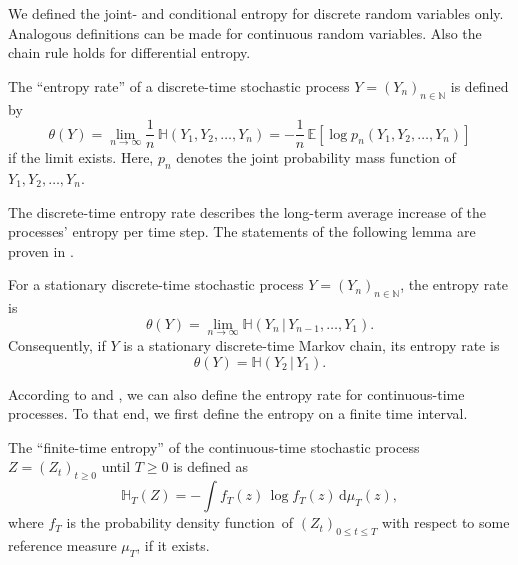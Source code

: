 \documentclass[smallextended]{svjour3}
\newcommand{\N}{\mathbb{N}}
\newcommand{\E}{\mathbb{E}}
\renewcommand{\H}{\mathbb{H}}
\newcommand{\liml}{\lim\limits}
\newcommand{\dd}[1]{\,\mathrm{d}#1}
\newcommand{\pdf}{probability density function}
\renewcommand{\emph}[1]{``#1''}
\begin{document}
\begin{myremark}
	We defined the joint- and conditional entropy for discrete random variables only.
	Analogous definitions can be made for continuous random variables.
	Also the chain rule holds for differential entropy.
\end{myremark}

\begin{definition}%
\label{def:entropy_rate}
	The \emph{entropy rate} of a discrete-time stochastic process $Y=(Y_n)_{n\in \N}$ is defined by
	\begin{equation}
		\theta(Y) = \liml_{n\to\infty} \frac{1}{n}\,\H(Y_1,Y_2,\ldots,Y_n) = -\frac{1}{n}\,\E\left[\log p_n(Y_1,Y_2,\ldots,Y_n)\right]
	\end{equation}
	if the limit exists.
	Here, $p_n$ denotes the joint probability mass function of $Y_1,Y_2,\ldots,Y_n$.
\end{definition}

The discrete-time entropy rate describes the long-term average increase of the processes' entropy per time step.
The statements of the following lemma are proven in \citet[Theorem~4.2.1]{Cover2006}.

\begin{mylemma}\label{lem:entropy_rate_st_MC}
	For a stationary discrete-time stochastic process $Y=(Y_n)_{n\in\N}$, the entropy rate is
	\begin{equation}
		\theta(Y) = \liml_{n\to\infty} \H(Y_n\,|\,Y_{n-1},\ldots,Y_1).
	\end{equation}
	Consequently, if $Y$ is a stationary discrete-time Markov chain, its entropy rate is
	\begin{equation}
		\theta(Y) = \H(Y_2\,|\,Y_1).
	\end{equation}
\end{mylemma}

According to \citet{Dumitrescu1988MICAS} and \citet{Girardin2003JAP}, we can also define the entropy rate for continuous-time processes.
To that end, we first define the entropy on a finite time interval.

\begin{definition}%
	The \emph{finite-time entropy} of the continuous-time stochastic process $Z=(Z_t)_{t\geq0}$ until $T\geq0$ is defined as
	\begin{equation}
		\H_T(Z) = - \int f_T(z)\,\log f_T(z)\dd{\mu_T(z)},	 
	\end{equation}
	where $f_T$ is the \pdf\ of $(Z_t)_{0\leq t\leq T}$ with respect to some reference measure $\mu_T$, if it exists.
\end{definition}
\end{document}
